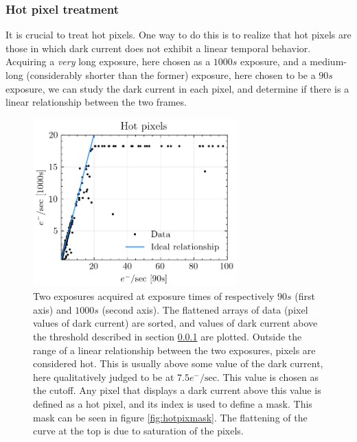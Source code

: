 \documentclass[../main.tex]{subfiles}
\begin{document}
		\subsubsection{Hot pixel treatment}\label{sect:hotpix}
		It is crucial to treat hot pixels. One way to do this is to realize that hot pixels are those in which dark current does not exhibit a linear temporal behavior. Acquiring a \textit{very} long exposure, here chosen as a $1000s$ exposure, and a medium-long (considerably shorter than the former) exposure, here chosen to be a $90s$ exposure, we can study the dark current in each pixel, and determine if there is a linear relationship between the two frames.
		\begin{figure}
			\centering			\includegraphics[width=0.7\textwidth]{hot_pixels_test.png}
			\caption{Two exposures acquired at exposure times of respectively $90s$ (first axis) and $1000s$ (second axis). The flattened arrays of data (pixel values of dark current) are sorted, and values of dark current above the threshold described in section \ref{sect:hotpix} are plotted. Outside the range of a linear relationship between the two exposures, pixels are considered hot. This is usually above some value of the dark current, here qualitatively judged to be at $7.5 e^-/\text{sec}$. This value is chosen as the cutoff. Any pixel that displays a dark current above this value is defined as a hot pixel, and its index is used to define a mask. This mask can be seen in figure \ref{fig:hotpixmask}. The flattening of the curve at the top is due to saturation of the pixels. 
			}
			\label{fig:hotpix}
		\end{figure}
		
\end{document}
